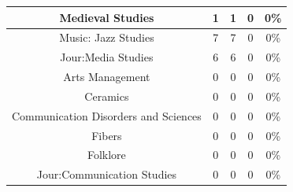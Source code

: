 \documentclass[10]{article}
\begin{document}
\begin{longtable}[c]{|ccccc|}
	\multicolumn{1}{|c|}{Medieval Studies}                           & \multicolumn{1}{c|}{1}                               & \multicolumn{1}{c|}{1}                                   & \multicolumn{1}{c|}{0}                  & 0\%                   \\ \hline
	\multicolumn{1}{|c|}{Music: Jazz Studies}                        & \multicolumn{1}{c|}{7}                               & \multicolumn{1}{c|}{7}                                   & \multicolumn{1}{c|}{0}                  & 0\%                   \\ \hline
	\multicolumn{1}{|c|}{Jour:Media Studies}                         & \multicolumn{1}{c|}{6}                               & \multicolumn{1}{c|}{6}                                   & \multicolumn{1}{c|}{0}                  & 0\%                   \\ \hline
	\multicolumn{1}{|c|}{Arts Management}                            & \multicolumn{1}{c|}{0}                               & \multicolumn{1}{c|}{0}                                   & \multicolumn{1}{c|}{0}                  & 0\%                   \\ \hline
	\multicolumn{1}{|c|}{Ceramics}                                   & \multicolumn{1}{c|}{0}                               & \multicolumn{1}{c|}{0}                                   & \multicolumn{1}{c|}{0}                  & 0\%                   \\ \hline
	\multicolumn{1}{|c|}{Communication Disorders and Sciences}       & \multicolumn{1}{c|}{0}                               & \multicolumn{1}{c|}{0}                                   & \multicolumn{1}{c|}{0}                  & 0\%                   \\ \hline
	\multicolumn{1}{|c|}{Fibers}                                     & \multicolumn{1}{c|}{0}                               & \multicolumn{1}{c|}{0}                                   & \multicolumn{1}{c|}{0}                  & 0\%                   \\ \hline
	\multicolumn{1}{|c|}{Folklore}                                   & \multicolumn{1}{c|}{0}                               & \multicolumn{1}{c|}{0}                                   & \multicolumn{1}{c|}{0}                  & 0\%                   \\ \hline
	\multicolumn{1}{|c|}{Jour:Communication Studies}                 & \multicolumn{1}{c|}{0}                               & \multicolumn{1}{c|}{0}                                   & \multicolumn{1}{c|}{0}                  & 0\%                   \\ \hline

\end{longtable}
\end{document}
